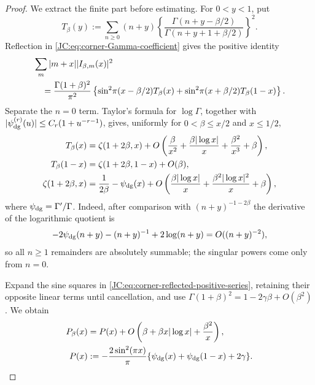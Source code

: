 \documentclass[11pt]{amsart}
\numberwithin{equation}{section}
\theoremstyle{definition}
\theoremstyle{remark}
\begin{document}
\begin{proof}
We extract the finite part before estimating.  For $0<y<1$, put
\[
 T_\beta(y):=\sum_{n\ge0}(n+y)
 \left\{\frac{\Gamma(n+y-\beta/2)}
 {\Gamma(n+y+1+\beta/2)}\right\}^2.
\]
Reflection in \eqref{JC:eq:corner-Gamma-coefficient} gives the positive
identity
\begin{align}
 &\sum_m|m+x||I_{\beta,m}(x)|^2\notag\\
 &\quad=
 \frac{\Gamma(1+\beta)^2}{\pi^2}
 \left\{\sin^2\!\pi(x-\beta/2)T_\beta(x)
 +\sin^2\!\pi(x+\beta/2)T_\beta(1-x)\right\}.
 \label{JC:eq:corner-reflected-positive-series}
\end{align}
Separate the $n=0$ term.  Taylor's formula for $\log\Gamma$, together
with $|\psi_{\rm dg}^{(r)}(u)|\le C_r(1+u^{-r-1})$, gives, uniformly
for $0<\beta\le x/2$ and $x\le1/2$,
\begin{align*}
 T_\beta(x)
 &=\zeta(1+2\beta,x)
 +O\left(\frac\beta{x^2}
 +\frac{\beta|\log x|}{x}
 +\frac{\beta^2}{x^3}+\beta\right),\\
 T_\beta(1-x)&=\zeta(1+2\beta,1-x)+O(\beta),\\
 \zeta(1+2\beta,x)
 &=\frac1{2\beta}-\psi_{\rm dg}(x)
 +O\left(\frac{\beta|\log x|}{x}
 +\frac{\beta^2|\log x|^2}{x}+\beta\right),
\end{align*}
where $\psi_{\rm dg}=\Gamma'/\Gamma$.  Indeed, after comparison with
$(n+y)^{-1-2\beta}$ the derivative of the logarithmic quotient is
\[
 -2\psi_{\rm dg}(n+y)-(n+y)^{-1}+2\log(n+y)
 =O((n+y)^{-2}),
\]
so all $n\ge1$ remainders are absolutely summable; the singular powers
come only from $n=0$.

Expand the sine squares in
\eqref{JC:eq:corner-reflected-positive-series}, retaining their opposite
linear terms until cancellation, and use
$\Gamma(1+\beta)^2=1-2\gamma\beta+O(\beta^2)$.  We obtain
\begin{align}
 P_\beta(x)&=P(x)+
 O\left(\beta+\beta x|\log x|+\frac{\beta^2}{x}\right),
 \label{JC:eq:corner-mesoscopic-remainder}\\
 P(x)&:=-\frac{2\sin^2(\pi x)}{\pi}
 \{\psi_{\rm dg}(x)+\psi_{\rm dg}(1-x)+2\gamma\}.
 \label{JC:eq:corner-renormalized-symbol}
\end{align}


\end{proof}
\end{document}
